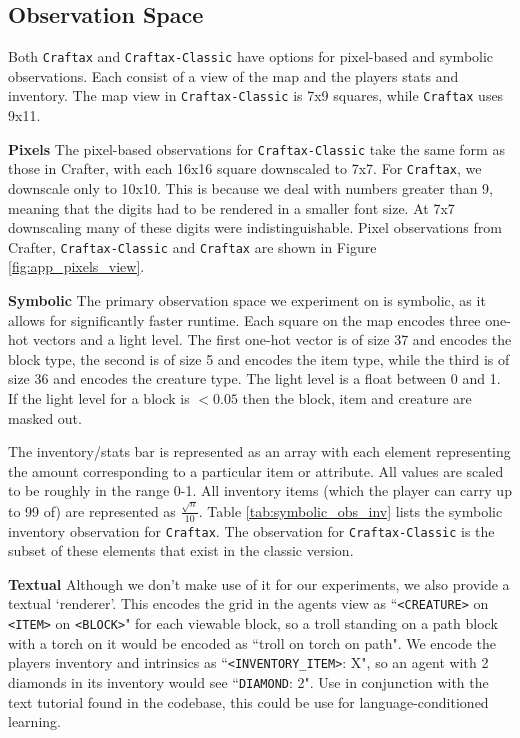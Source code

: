 \documentclass{article}
\theoremstyle{plain}
\theoremstyle{definition}
\theoremstyle{remark}
\begin{document}
\subsection{Observation Space} \label{app:obs_space}

Both \texttt{Craftax} and \texttt{Craftax-Classic} have options for pixel-based and symbolic observations.  Each consist of a view of the map and the players stats and inventory.  The map view in \texttt{Craftax-Classic} is 7x9 squares, while \texttt{Craftax} uses 9x11.

\textbf{Pixels} The pixel-based observations for \texttt{Craftax-Classic} take the same form as those in Crafter, with each 16x16 square downscaled to 7x7.  For \texttt{Craftax}, we downscale only to 10x10.  This is because we deal with numbers greater than 9, meaning that the digits had to be rendered in a smaller font size.  At 7x7 downscaling many of these digits were indistinguishable.  Pixel observations from Crafter, \texttt{Craftax-Classic} and \texttt{Craftax} are shown in Figure \ref{fig:app_pixels_view}.

\textbf{Symbolic}  The primary observation space we experiment on is symbolic, as it allows for significantly faster runtime.  Each square on the map encodes three one-hot vectors and a light level.  The first one-hot vector is of size 37 and encodes the block type, the second is of size 5 and encodes the item type, while the third is of size 36 and encodes the creature type.  The light level is a float between 0 and 1.  If the light level for a block is $<0.05$ then the block, item and creature are masked out.

The inventory/stats bar is represented as an array with each element representing the amount corresponding to a particular item or attribute.  All values are scaled to be roughly in the range 0-1.  All inventory items (which the player can carry up to 99 of) are represented as $\frac{\sqrt{n}}{10}$.  Table \ref{tab:symbolic_obs_inv} lists the symbolic inventory observation for \texttt{Craftax}.  The observation for \texttt{Craftax-Classic} is the subset of these elements that exist in the classic version.

\textbf{Textual} Although we don't make use of it for our experiments, we also provide a textual `renderer'.  This encodes the grid in the agents view as ``\texttt{<CREATURE>} on \texttt{<ITEM>} on \texttt{<BLOCK>}" for each viewable block, so a troll standing on a path block with a torch on it would be encoded as ``troll on torch on path".  We encode the players inventory and intrinsics as ``\texttt{<INVENTORY\_ITEM>}: X", so an agent with 2 diamonds in its inventory would see ``\texttt{DIAMOND}: 2".  Use in conjunction with the text tutorial found in the codebase, this could be use for language-conditioned learning.
\end{document}
